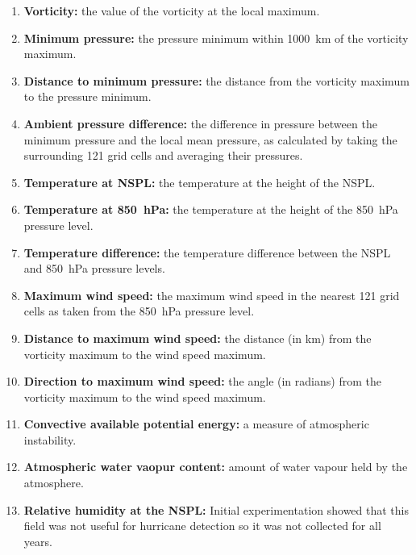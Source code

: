 \documentclass[pdftex,12pt,a4paper]{report}
\begin{document}
\begin{enumerate}
   \item \textbf{Vorticity:} the value of the vorticity at the local maximum.
    \item \textbf{Minimum pressure:} the pressure minimum within \SI{1000}{km} of the vorticity
        maximum.
    \item \textbf{Distance to minimum pressure:} the distance from the vorticity maximum to the
        pressure minimum.
    \item \textbf{Ambient pressure difference:} the difference in pressure between the minimum
        pressure and the local mean pressure, as calculated by taking the surrounding 121 grid cells
        and averaging their pressures.
    \item \textbf{Temperature at NSPL:} the temperature at the height of the NSPL.
    \item \textbf{Temperature at \SI{850}{hPa}:} the temperature at the height of the \SI{850}{hPa}
        pressure level.
    \item \textbf{Temperature difference:} the temperature difference between the NSPL and
        \SI{850}{hPa} pressure levels.
    \item \textbf{Maximum wind speed:} the maximum wind speed in the nearest 121 grid cells as taken
        from the \SI{850}{hPa} pressure level.
    \item \textbf{Distance to maximum wind speed:} the distance (in km) from the vorticity
        maximum to the wind speed maximum.
    \item \textbf{Direction to maximum wind speed:} the angle (in radians) from the vorticity
        maximum to the wind speed maximum.
    \item \textbf{Convective available potential energy:} a measure of atmospheric instability.
    \item \textbf{Atmospheric water vaopur content:} amount of water vapour held by the atmosphere.
    \item \textbf{Relative humidity at the NSPL:} Initial experimentation showed that this field was
        not useful for hurricane detection so it was not collected for all years.
\end{enumerate}

\end{document}
